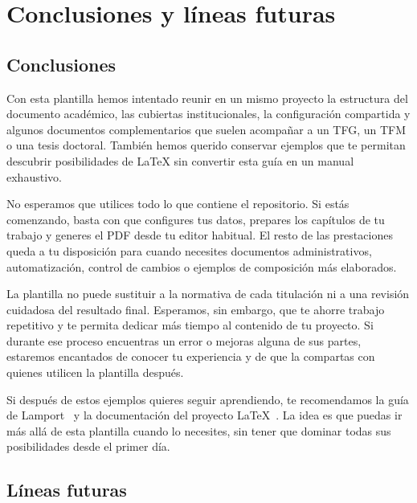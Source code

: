%

\chapter{Conclusiones y líneas futuras}
\label{cha:conclusiones}

\section{Conclusiones}

Con esta plantilla hemos intentado reunir en un mismo proyecto la estructura del documento académico, las cubiertas institucionales, la configuración compartida y algunos documentos complementarios que suelen acompañar a un TFG, un TFM o una tesis doctoral. También hemos querido conservar ejemplos que te permitan descubrir posibilidades de \LaTeX{} sin convertir esta guía en un manual exhaustivo.

No esperamos que utilices todo lo que contiene el repositorio. Si estás comenzando, basta con que configures tus datos, prepares los capítulos de tu trabajo y generes el PDF desde tu editor habitual. El resto de las prestaciones queda a tu disposición para cuando necesites documentos administrativos, automatización, control de cambios o ejemplos de composición más elaborados.

La plantilla no puede sustituir a la normativa de cada titulación ni a una revisión cuidadosa del resultado final. Esperamos, sin embargo, que te ahorre trabajo repetitivo y te permita dedicar más tiempo al contenido de tu proyecto. Si durante ese proceso encuentras un error o mejoras alguna de sus partes, estaremos encantados de conocer tu experiencia y de que la compartas con quienes utilicen la plantilla después.

Si después de estos ejemplos quieres seguir aprendiendo, te recomendamos la guía de Lamport~\cite{lamport94} y la documentación del proyecto \LaTeX{}~\cite{latex-project-docs}. La idea es que puedas ir más allá de esta plantilla cuando lo necesites, sin tener que dominar todas sus posibilidades desde el primer día.

\section{Líneas futuras}

